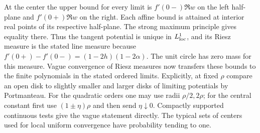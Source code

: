 At the center the upper bound for every limit is \(f'(0-)\Re w\) on the left half-plane and \(f'(0+)\Re w\) on the right. Each affine bound is attained at interior real points of its respective half-plane. The strong maximum principle gives equality there. Thus the tangent potential is unique in \(L^1_{\rm loc}\), and its Riesz measure is the stated line measure because \(f'(0+)-f'(0-)=(1-2h)(1-2\alpha)\). The unit circle has zero mass for this measure. Vague convergence of Riesz measures now transfers these bounds to the finite polynomials in the stated ordered limits. Explicitly, at fixed \(\rho\) compare an open disk to slightly smaller and larger disks of limiting potentials by Portmanteau. For the quadratic orders one may use radii \(\rho/2,2\rho\); for the central constant first use \((1\pm\eta)\rho\) and then send \(\eta\downarrow0\). Compactly supported continuous tests give the vague statement directly. The typical sets of centers used for local uniform convergence have probability tending to one.
